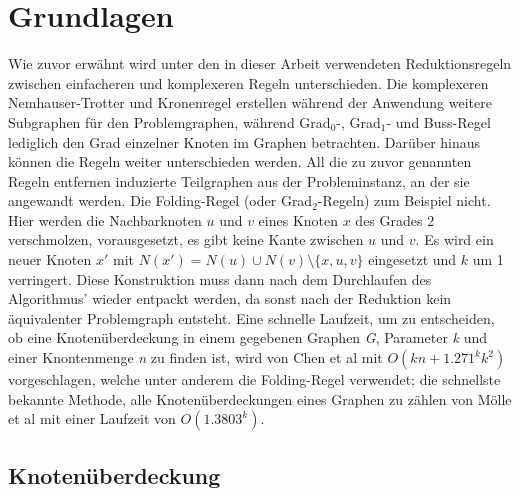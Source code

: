 
\chapter{Grundlagen}
\label{ch:Grundlagen}
Wie zuvor erwähnt wird unter den in dieser Arbeit verwendeten Reduktionsregeln zwischen einfacheren und komplexeren Regeln unterschieden. Die komplexeren Nemhauser-Trotter und Kronenregel erstellen während der Anwendung weitere Subgraphen für den Problemgraphen, während Grad$_{0}$-, Grad$_{1}$- und Buss-Regel lediglich den Grad einzelner Knoten im Graphen betrachten. Darüber hinaus können die Regeln weiter unterschieden werden. All die zu zuvor genannten Regeln entfernen induzierte Teilgraphen aus der Probleminstanz, an der sie angewandt werden. Die Folding-Regel \cite{paper:4} (oder Grad$_{2}$-Regeln) zum Beispiel nicht. Hier werden die Nachbarknoten $u$ und $v$ eines Knoten $x$ des Grades 2 verschmolzen, vorausgesetzt, es gibt keine Kante zwischen  $u$ und $v$. Es wird ein neuer Knoten $x'$ mit $N(x') = N(u) \cup N(v) \setminus \{x,u,v\}$ eingesetzt und $k$ um 1 verringert. Diese Konstruktion muss dann nach dem Durchlaufen des Algorithmus' wieder entpackt werden, da sonst nach der Reduktion kein äquivalenter Problemgraph entsteht. 
Eine schnelle Laufzeit, um zu entscheiden, ob eine Knotenüberdeckung in einem gegebenen Graphen \emph{G}, Parameter \emph{k} und einer Knontenmenge \emph{n} zu finden ist, wird von Chen et al \cite{paper:4} mit $O(kn + 1.271^{k}k^{2})$ vorgeschlagen, welche unter anderem die Folding-Regel verwendet; die schnellste bekannte Methode, alle Knotenüberdeckungen eines Graphen zu zählen von Mölle et al \cite{paper:5} mit einer Laufzeit von $O(1.3803^{k})$.

\section{Knotenüberdeckung}
\label{ch:Grundlagen:sec:Knotenüberdeckung}
